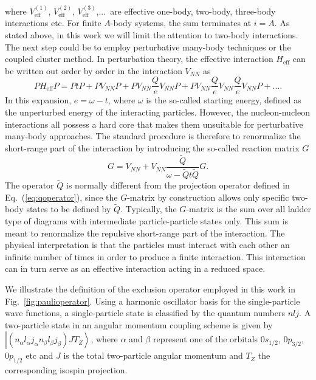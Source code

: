 where $ V_{\mathrm{eff}}^{(1)}$,  $ V_{\mathrm{eff}}^{(2)}$,
 $ V_{\mathrm{eff}}^{(3)}$,...\ are effective one-body, two-body,
three-body interactions etc. For finite $A$-body systems, the sum terminates
at $i=A$. As stated above, in this work we will limit the
attention to two-body interactions.
The next step could be to employ perturbative many-body techniques 
or the coupled 
cluster method.
In  perturbation theory, the effective interaction
$H_{\mathrm{eff}}$ can be written out order by order in the 
interaction $V_{NN}$ as
\begin{equation}
               PH_{\mathrm{eff}}P=PtP+PV_{NN}P +PV_{NN}\frac{Q}{e}V_{NN} P+
               PV_{NN}\frac{Q}{e}V_{NN} \frac{Q}{e}V_{NN} P+\dots.
               \label{eq:effint}
\end{equation}
In this expansion, $e=\omega -t$,
where $\omega$ is the so-called starting energy, defined as the unperturbed
energy of the interacting particles.
However, 
the nucleon-nucleon interactions all possess a hard core that 
makes them unsuitable for perturbative many-body approaches. The
standard procedure is therefore to  renormalize the short-range part of the 
interaction by introducing the so-called reaction matrix $G$
\begin{equation}
G=V_{NN}+V_{NN}\frac{\tilde{Q}}{\omega - \tilde{Q}t\tilde{Q}}G.
\label{eq:gfinite}
\end{equation}
The operator $\tilde{Q}$ is normally different from the 
projection operator defined in Eq.~(\ref{eq:qoperator}), 
since the $G$-matrix by construction 
allows only specific two-body states to be defined by $\tilde{Q}$.
Typically,  
the $G$-matrix is the sum over all
ladder type of diagrams with intermediate particle-particle states
only. This sum is meant to renormalize
the repulsive short-range part of the interaction. The physical interpretation
is that the particles must interact with each other an infinite number
of times in order to produce a finite interaction. This interaction can in turn
serve as an effective interaction acting in a reduced space. 

We illustrate the definition of the exclusion operator employed in this
work in Fig.~\ref{fig:paulioperator}. 
Using a harmonic oscillator basis for the single-particle wave functions,
a single-particle state is classified by the quantum numbers $nlj$.
A two-particle state in an angular momentum coupling scheme is given by
$\left| (n_{\alpha}l_{\alpha}j_{\alpha}n_{\beta}l_{\beta}j_{\beta})JT_Z\right \rangle$, where $\alpha$ and $\beta$ represent one of the orbitals 
$0s_{1/2}$, $0p_{3/2}$, $0p_{1/2}$ etc and $J$ is the total two-particle
angular momentum and $T_Z$ the corresponding isospin projection.

